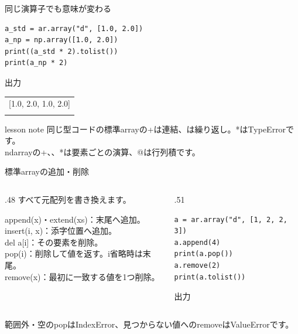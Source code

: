 \documentclass[12pt,aspectratio=43]{beamer}
\newcommand{\code}[1]{{\codefont #1}}
\newcommand{\out}[1]{%
  \par\vspace{.5mm}\noindent
  {\small\textcolor{black!60}{出力}}\hspace{1mm}%
  \begin{minipage}[t]{.88\linewidth}\vspace{0pt}%
    {\codefont\fontsize{11}{12.5}\selectfont #1}%
  \end{minipage}\par}
\newenvironment{lessonbox}
  {\begin{beamercolorbox}[wd=\linewidth,sep=1.5mm]{lesson note}}
  {\end{beamercolorbox}\par}
\begin{document}
\begin{frame}[t,fragile]{同じ演算子でも意味が変わる}
  \vspace{-1mm}
\begin{lstlisting}
a_std = ar.array("d", [1.0, 2.0])
a_np = np.array([1.0, 2.0])
print((a_std * 2).tolist())
print(a_np * 2)
\end{lstlisting}
  \out{\begin{tabular}{@{}l@{}}
    [1.0, 2.0, 1.0, 2.0]\\\relax
    [2. 4.]
  \end{tabular}}
  \vspace{-1mm}
  \begin{lessonbox}
    同じ型コードの標準\code{array}の\code{+}は連結、\code{* 2}は繰り返し。\code{**}は\code{TypeError}です。\\
    \code{ndarray}の\code{+}、\code{*}、\code{**}は要素ごとの演算、\code{@}は行列積です。
  \end{lessonbox}
\end{frame}

\begin{frame}[t,fragile]{標準\code{array}の追加・削除}
  \begin{columns}[T,onlytextwidth]
    \begin{column}{.48\textwidth}
      \small すべて元配列を書き換えます。
      \par\vspace{1mm}
      \code{append(x)}・\code{extend(xs)}：末尾へ追加。\\
      \code{insert(i, x)}：添字位置へ追加。\\
      \code{del a[i]}：その要素を削除。\\
      \code{pop(i)}：削除して値を返す。\code{i}省略時は末尾。\\
      \code{remove(x)}：最初に一致する値を1つ削除。
    \end{column}
    \begin{column}{.51\textwidth}
\begin{lstlisting}
a = ar.array("d", [1, 2, 2, 3])
a.append(4)
print(a.pop())
a.remove(2)
print(a.tolist())
\end{lstlisting}
      \out{4.0\par [1.0, 2.0, 3.0]}
    \end{column}
  \end{columns}
  \vspace{1mm}
  \small 範囲外・空の\code{pop}は\code{IndexError}、見つからない値への\code{remove}は\code{ValueError}です。
\end{frame}
\end{document}
